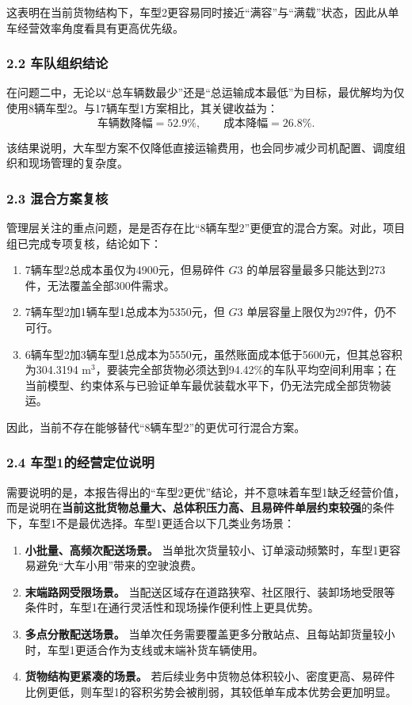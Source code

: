 \documentclass{MMCStyle}
\begin{document}
\noindent
这表明在当前货物结构下，车型2更容易同时接近“满容”与“满载”状态，因此从单车经营效率角度看具有更高优先级。

\subsubsection*{2.2 车队组织结论}

\noindent
在问题二中，无论以“总车辆数最少”还是“总运输成本最低”为目标，最优解均为仅使用8辆车型2。与17辆车型1方案相比，其关键收益为：
\begin{equation}
\text{车辆数降幅}=52.9\%,\qquad
\text{成本降幅}=26.8\%.
\end{equation}

\noindent
该结果说明，大车型方案不仅降低直接运输费用，也会同步减少司机配置、调度组织和现场管理的复杂度。

\subsubsection*{2.3 混合方案复核}

\noindent
管理层关注的重点问题，是是否存在比“8辆车型2”更便宜的混合方案。对此，项目组已完成专项复核，结论如下：

\begin{enumerate}
\item 7辆车型2总成本虽仅为4900元，但易碎件 $G3$ 的单层容量最多只能达到273件，无法覆盖全部300件需求。
\item 7辆车型2加1辆车型1总成本为5350元，但 $G3$ 单层容量上限仅为297件，仍不可行。
\item 6辆车型2加3辆车型1总成本为5550元，虽然账面成本低于5600元，但其总容积为304.3194 m$^3$，要装完全部货物必须达到94.42\%的车队平均空间利用率；在当前模型、约束体系与已验证单车最优装载水平下，仍无法完成全部货物装运。
\end{enumerate}

\noindent
因此，当前不存在能够替代“8辆车型2”的更优可行混合方案。

\subsubsection*{2.4 车型1的经营定位说明}

\noindent
需要说明的是，本报告得出的“车型2更优”结论，并不意味着车型1缺乏经营价值，而是说明在\textbf{当前这批货物总量大、总体积压力高、且易碎件单层约束较强}的条件下，车型1不是最优选择。车型1更适合以下几类业务场景：

\begin{enumerate}
\item \textbf{小批量、高频次配送场景。} 当单批次货量较小、订单滚动频繁时，车型1更容易避免“大车小用”带来的空驶浪费。
\item \textbf{末端路网受限场景。} 当配送区域存在道路狭窄、社区限行、装卸场地受限等条件时，车型1在通行灵活性和现场操作便利性上更具优势。
\item \textbf{多点分散配送场景。} 当单次任务需要覆盖更多分散站点、且每站卸货量较小时，车型1更适合作为支线或末端补货车辆使用。
\item \textbf{货物结构更紧凑的场景。} 若后续业务中货物总体积较小、密度更高、易碎件比例更低，则车型1的容积劣势会被削弱，其较低单车成本优势会更加明显。
\end{enumerate}
\end{document}
